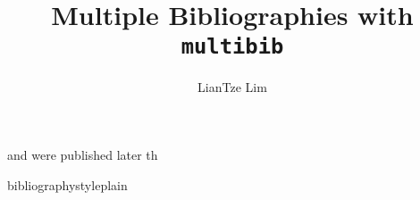 \documentclass[11pt]{article}
\title{Multiple Bibliographies with \texttt{multibib}}
\author{LianTze Lim}
\date{}
\begin{document}
\maketitle

\cite{Miller1995WordNet:English} and \cite{Pulli2012Real-timeOpenCV} were published later th

bibliographystyle{plain}
\usepackage{biblatex}


\end{document}
